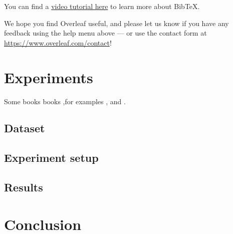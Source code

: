 \documentclass[a4paper]{article}
\begin{document}
You can find a \href{https://www.overleaf.com/help/97-how-to-include-a-bibliography-using-bibtex}{video tutorial here} to learn more about BibTeX.

We hope you find Overleaf useful, and please let us know if you have any feedback using the help menu above --- or use the contact form at \url{https://www.overleaf.com/contact}!


\section{Experiments}
Some books books ,for examples ,\cite{chen2015b} and \cite{Min2006b}  .
\subsection{Dataset}
\subsection{Experiment setup}
\subsection{Results}

\section{Conclusion}



\end{document}
